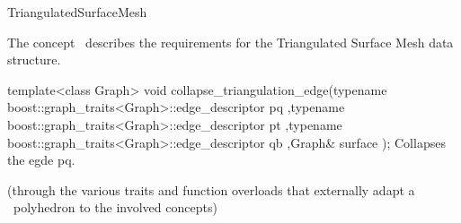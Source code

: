 
\begin{ccRefConcept}{TriangulatedSurfaceMesh}


\ccDefinition

The concept \ccRefName\ describes the requirements for the Triangulated Surface Mesh data structure.

\ccRefines
{}


\ccOperations

  \ccFunction
  {template<class Graph>
  void
  collapse_triangulation_edge(typename boost::graph_traits<Graph>::edge_descriptor pq
                             ,typename boost::graph_traits<Graph>::edge_descriptor pt
                             ,typename boost::graph_traits<Graph>::edge_descriptor qb
                             ,Graph& surface
                             );
  }
  {Collapses the egde pq.
  }

\ccHasModels
{}
  (through the various traits and function overloads that externally adapt a \cgal\
  polyhedron to the involved concepts)

\end{ccRefConcept}

